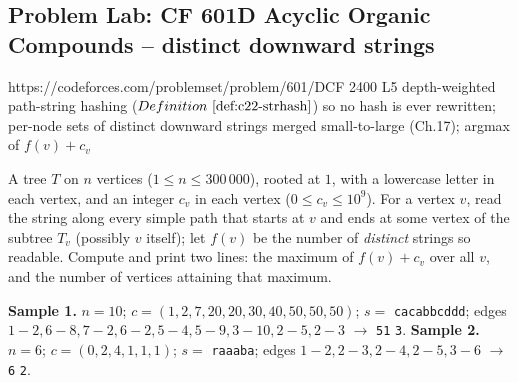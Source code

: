 \subsection{Problem Lab: CF 601D Acyclic Organic Compounds -- distinct downward strings}

  {https://codeforces.com/problemset/problem/601/D}{CF 2400 L5}
  {depth-weighted path-string hashing (\(\defref{c22-strhash}\)) so no hash is ever rewritten; per-node sets of distinct downward strings merged small-to-large (Ch.17); argmax of \(f(v)+c_v\)}

\begin{problemstatement}
A tree \(T\) on \(n\) vertices (\(1\le n\le 300\,000\)), rooted at \(1\), with a
lowercase letter in each vertex, and an integer \(c_v\) in each vertex
(\(0\le c_v\le 10^{9}\)).  For a vertex \(v\), read the string along every simple
path that starts at \(v\) and ends at some vertex of the subtree \(T_v\) (possibly
\(v\) itself); let \(f(v)\) be the number of \emph{distinct} strings so readable.
Compute and print two lines: the maximum of \(f(v)+c_v\) over all \(v\), and the
number of vertices attaining that maximum.

\textbf{Sample 1.} \(n{=}10\); \(c=(1,2,7,20,20,30,40,50,50,50)\);
\(s=\) \texttt{cacabbcddd}; edges \(1\!-\!2, 6\!-\!8, 7\!-\!2, 6\!-\!2, 5\!-\!4,
5\!-\!9, 3\!-\!10, 2\!-\!5, 2\!-\!3\) \(\to\) \texttt{51} \texttt{3}.
\textbf{Sample 2.} \(n{=}6\); \(c=(0,2,4,1,1,1)\); \(s=\) \texttt{raaaba}; edges
\(1\!-\!2, 2\!-\!3, 2\!-\!4, 2\!-\!5, 3\!-\!6\) \(\to\) \texttt{6} \texttt{2}.
\end{problemstatement}

